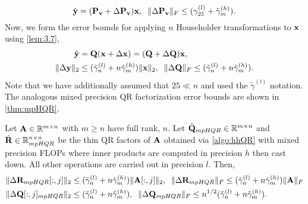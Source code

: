 \begin{equation}
	\hat{\bb{y}} = (\bb{P_v} + \Delta \bb{P_v})\bb{x},\;\; \|\Delta \bb{P_v}\|_F\leq (\gamma_{25}^{(l)} + \tilde{\gamma}_{m}^{(h)}). \label{eqn:mpapplyP}
\end{equation}
Now, we form the error bounds for applying $n$ Householder transformations to $\mathbf{x}$ using \cref{lem:3.7},
\begin{align}
\hat{\bb{y}} &= \bb{Q} (\bb{x} +\Delta \bb{x}) = (\bb{Q} + \Delta \bb{Q})\bb{x},\\
\|\Delta \bb{y}\|_2 &\leq (\tilde{\gamma}_n^{(l)}+n\tilde{\gamma}_m^{(h)})\|\bb{x}\|_2,\;\; \|\Delta \bb{Q}\|_F\leq (\tilde{\gamma}_n^{(l)}+n\tilde{\gamma}_m^{(h)}).\label{eqn:mp19.3}
\end{align} 
Note that we have additionally assumed that $25 \ll n$ and used the $\tilde{\gamma}^{(l)}$ notation.
The analogous mixed precision QR factorization error bounds are shown in \cref{thm:mpHQR}.
\begin{theorem}
	\label{thm:mpHQR}
	Let $\mathbf{A}\in\mathbb{R}^{m\times n}$ with $m\geq n$ have full rank, $n$. 
	Let $\hat{\mathbf{Q}}_{mpHQR}\in\mathbb{R}^{m\times n}$ and $\hat{\mathbf{R}}\in\mathbb{R}^{n\times n}_{mpHQR}$ be the thin QR factors of $\mathbf{A}$ obtained via \cref{algo:hhQR} with mixed precision FLOPs where inner products are computed in precision $h$ then cast down.
	All other operations are carried out in precision $l$.
	Then,
	\begin{align*}
	\|\Delta \mathbf{R}_{mpHQR}[:,j]\|_2&\leq (\tilde{\gamma}_n^{(l)}+n\tilde{\gamma}_m^{(h)}) \|\mathbf{A}[:,j]\|_2,\;\; \|\Delta \mathbf{R}_{mpHQR}\|_F\leq (\tilde{\gamma}_n^{(l)}+n\tilde{\gamma}_m^{(h)}) \|\mathbf{A}\|_F\\
	\|\Delta \mathbf{Q}[:,j]_{mpHQR}\|_2&\leq (\tilde{\gamma}_n^{(l)}+n\tilde{\gamma}_m^{(h)}),\;\; \|\Delta \mathbf{Q}_{mpHQR}\|_F \leq n^{1/2} (\tilde{\gamma}_n^{(l)}+n\tilde{\gamma}_m^{(h)}).
	\end{align*}
\end{theorem}

